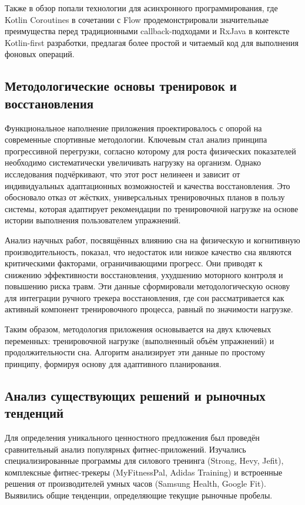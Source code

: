 Также в обзор попали технологии для асинхронного программирования, где Kotlin Coroutines в сочетании с Flow продемонстрировали значительные преимущества перед традиционными callback-подходами и RxJava в контексте Kotlin-first разработки, предлагая более простой и читаемый код для выполнения фоновых операций. \cite{refi}

\subsection{Методологические основы тренировок и восстановления}

Функциональное наполнение приложения проектировалось с опорой на современные спортивные методологии. Ключевым стал анализ принципа прогрессивной перегрузки, согласно которому для роста физических показателей необходимо систематически увеличивать нагрузку на организм. \cite{refj} Однако исследования подчёркивают, что этот рост нелинеен и зависит от индивидуальных адаптационных возможностей и качества восстановления. Это обосновало отказ от жёстких, универсальных тренировочных планов в пользу системы, которая адаптирует рекомендации по тренировочной нагрузке на основе истории выполнения пользователем упражнений.

Анализ научных работ, посвящённых влиянию сна на физическую и когнитивную производительность, показал, что недостаток или низкое качество сна являются критическими факторами, ограничивающими прогресс. \cite{refk} Они приводят к снижению эффективности восстановления, ухудшению моторного контроля и повышению риска травм. Эти данные сформировали методологическую основу для интеграции ручного трекера восстановления, где сон рассматривается как активный компонент тренировочного процесса, равный по значимости нагрузке.

Таким образом, методология приложения основывается на двух ключевых переменных: тренировочной нагрузке (выполненный объём упражнений) и продолжительности сна. Алгоритм анализирует эти данные по простому принципу, формируя основу для адаптивного планирования. \cite{refj,refk}

\subsection{Анализ существующих решений и рыночных тенденций}

Для определения уникального ценностного предложения был проведён сравнительный анализ популярных фитнес-приложений. Изучались специализированные программы для силового тренинга (Strong, Hevy, Jefit), комплексные фитнес-трекеры (MyFitnessPal, Adidas Training) и встроенные решения от производителей умных часов (Samsung Health, Google Fit). Выявились общие тенденции, определяющие текущие рыночные пробелы.

